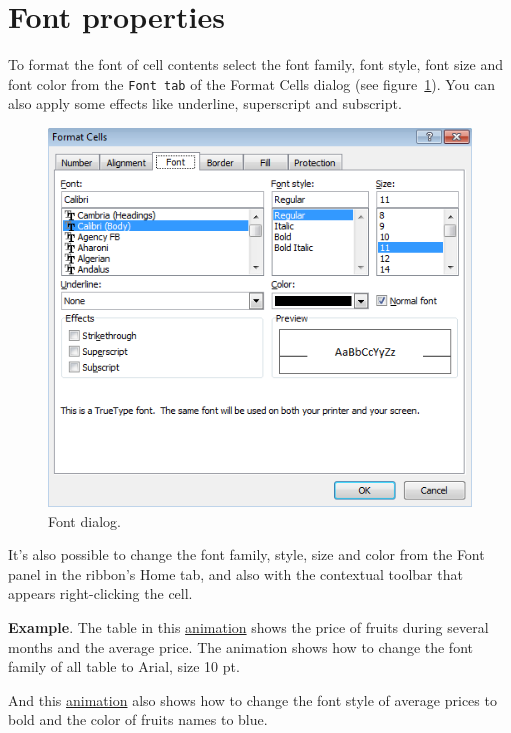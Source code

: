 \section{Font properties}\hypertarget{font-properties}{}\label{font-properties}

To format the font of cell contents select the font family, font style, font size and font color from the \texttt{Font
tab} of the Format Cells dialog (see figure~\ref{img-font_dialog}). You can also apply some effects like underline, superscript
and subscript.

\begin{figure}[htbp]
\begin{center}
\includegraphics[scale=0.7]{../img/font_dialog.png}
\end{center}
\caption{Font dialog.}
\label{img-font_dialog}
\end{figure}

It's also possible to change the font family, style, size and color from the Font panel in the ribbon's Home tab, and also with the contextual toolbar that appears right-clicking the cell.

\textbf{Example}. The table in this
\href{http://aprendeconalf.es/office/excel/manual/img/example_font_family.gif}{animation} shows the price of fruits
during several months and the average price. The animation shows how to change the font family of all table to Arial,
size 10 pt. 

And this \href{http://aprendeconalf.es/office/excel/manual/img/example_font_colour.gif}{animation} also shows how
to change the font style of average prices to bold and the color of fruits names to blue.


